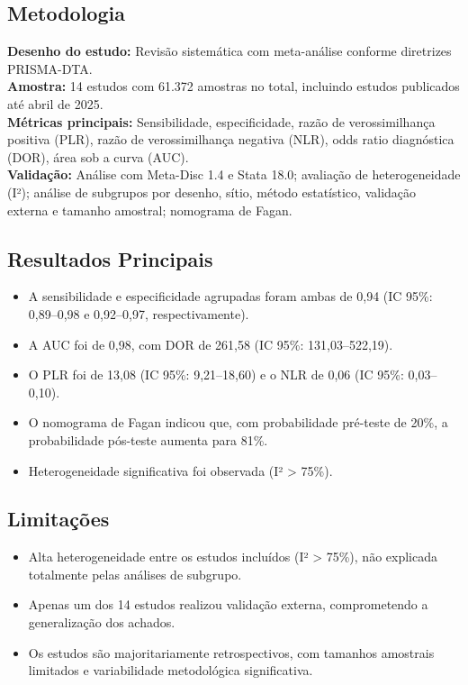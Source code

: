 \subsection{Metodologia}
\textbf{Desenho do estudo:} Revisão sistemática com meta-análise conforme
diretrizes PRISMA-DTA. \\
\textbf{Amostra:} 14 estudos com 61.372 amostras no total, incluindo estudos
publicados até abril de 2025. \\
\textbf{Métricas principais:} Sensibilidade, especificidade, razão de
verossimilhança positiva (PLR), razão de verossimilhança negativa (NLR),
odds ratio diagnóstica (DOR), área sob a curva (AUC). \\
\textbf{Validação:} Análise com Meta-Disc 1.4 e Stata 18.0; avaliação de
heterogeneidade (I²); análise de subgrupos por desenho, sítio, método
estatístico, validação externa e tamanho amostral; nomograma de Fagan.

\subsection{Resultados Principais}
\begin{itemize}
  \item A sensibilidade e especificidade agrupadas foram ambas de 0,94
        (IC 95\%: 0,89--0,98 e 0,92--0,97, respectivamente).
  \item A AUC foi de 0,98, com DOR de 261,58 (IC 95\%: 131,03--522,19).
  \item O PLR foi de 13,08 (IC 95\%: 9,21--18,60) e o NLR de 0,06
        (IC 95\%: 0,03--0,10).
  \item O nomograma de Fagan indicou que, com probabilidade pré-teste de 20\%,
        a probabilidade pós-teste aumenta para 81\%.
  \item Heterogeneidade significativa foi observada (I² > 75\%).
\end{itemize}

\subsection{Limitações}
\begin{itemize}
  \item Alta heterogeneidade entre os estudos incluídos (I² > 75\%), não
        explicada totalmente pelas análises de subgrupo.
  \item Apenas um dos 14 estudos realizou validação externa, comprometendo
        a generalização dos achados.
  \item Os estudos são majoritariamente retrospectivos, com tamanhos amostrais
        limitados e variabilidade metodológica significativa.
\end{itemize}

